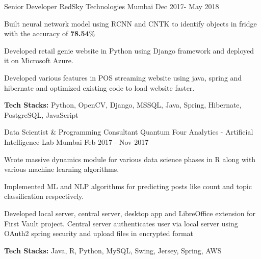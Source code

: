 \begin{cventries}
  \cventry
    {Senior Developer} %
    {RedSky Technologies} %
    {Mumbai} %
    {Dec 2017- May 2018} %
    {
      \begin{cvitems} %
        \item {Built neural network model using RCNN and CNTK to identify objects in fridge with the accuracy of \textbf{78.54}\%}
        \item {Developed retail genie website in Python using Django framework and deployed it on Microsoft Azure.}
        \item {Developed various features in POS streaming website using java, spring and hibernate and optimized existing code to load website faster.}
        \item {\textbf{Tech Stacks:} Python, OpenCV, Django, MSSQL, Java, Spring, Hibernate, PostgreSQL, JavaScript}
      \end{cvitems}
    }

  \cventry
    {Data Scientist \& Programming Consultant} %
    {Quantum Four Analytics - Artificial Intelligence Lab} %
    {Mumbai} %
    {Feb 2017 - Nov 2017} %
    {
      \begin{cvitems} %
        \item {Wrote massive dynamics module for various data science phases in R along with various machine learning algorithms.}
        \item {Implemented ML and NLP algorithms for predicting posts like count and topic classification respectively.}
        \item {Developed local server, central server, desktop app and LibreOffice extension for First Vault project. Central server authenticates user via local server using OAuth2 spring security and upload files in encrypted format}
        \item {\textbf{Tech Stacks:} Java, R, Python, MySQL, Swing, Jersey, Spring, AWS}
      \end{cvitems}
    }



\end{cventries}
